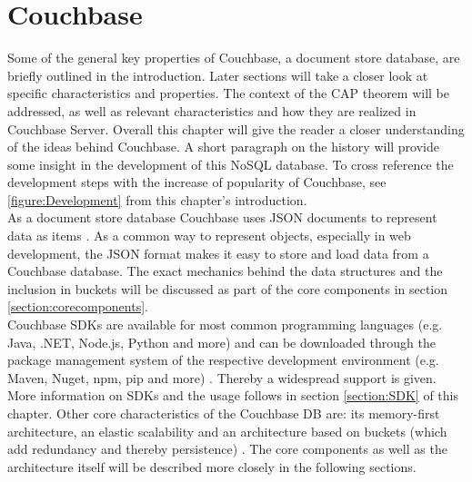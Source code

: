 \section{Couchbase}
Some of the general key properties of Couchbase, a document store database, are briefly outlined in the introduction. Later sections will take a closer look at specific characteristics and properties. The context of the CAP theorem will be addressed, as well as relevant characteristics and how they are realized in Couchbase Server. Overall this chapter will give the reader a closer understanding of the ideas behind Couchbase. A short paragraph on the history will provide some insight in the development of this NoSQL database. To cross reference the development steps with the increase of popularity of Couchbase, see \autoref{figure:Development} from this chapter’s introduction.\\
As a document store database Couchbase uses JSON documents to represent data as items \parencite{couchbaseAbout} \parencite{objelean}. As a common way to represent objects, especially in web development, the JSON format makes it easy to store and load data from a Couchbase database. The exact mechanics behind the data structures and the inclusion in buckets will be discussed as part of the core components in section \ref{section:corecomponents}.\\
Couchbase SDKs are available for most common programming languages (e.g. Java, .NET, Node.js, Python and more) and can be downloaded through the package management system of the respective development environment (e.g. Maven, Nuget, npm, pip and more) \parencite{couchbaseWeb} \parencite{objelean}. Thereby a widespread support is given. More information on SDKs and the usage follows in section \ref{section:SDK} of this chapter.
Other core characteristics of the Couchbase DB are: its memory-first architecture, an elastic scalability and an architecture based on buckets (which add redundancy and thereby persistence) \parencite{couchbaseWeb}. The core components as well as the architecture itself will be described more closely in the following sections.

